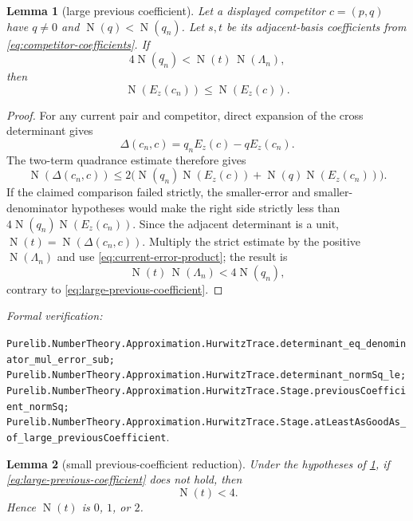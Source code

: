 \documentclass[11pt]{article}
\newtheorem{lemma}[lemma]{Lemma}
\newcommand{\Norm}[1]{\operatorname{N}\!\left(#1\right)}
\newcommand{\leanref}[1]{\par\smallskip\noindent
  \emph{Formal verification:}\par\nobreak
  {\raggedright\nolinkurl{#1}.\par}}
\begin{document}
\begin{lemma}[large previous coefficient]
\label{lem:large-previous-coefficient}
Let a displayed competitor $c=(p,q)$ have $q\ne0$ and
$\Norm q<\Norm{q_n}$.  Let $s,t$ be its adjacent-basis coefficients from
\eqref{eq:competitor-coefficients}.  If
\begin{equation}
\label{eq:large-previous-coefficient}
       4\Norm{q_n}<\Norm t\,\Norm{\Lambda_n},
\end{equation}
then
\[
                         \Norm{E_z(c_n)}\le\Norm{E_z(c)}.
\]
\end{lemma}

\begin{proof}
For any current pair and competitor, direct expansion of the cross
determinant gives
\[
 \Delta(c_n,c)=q_nE_z(c)-qE_z(c_n).
\]
The two-term quadrance estimate therefore gives
\begin{equation}
\label{eq:determinant-error-bound}
 \Norm{\Delta(c_n,c)}
 \le2\bigl(\Norm{q_n}\Norm{E_z(c)}
           +\Norm q\Norm{E_z(c_n)}\bigr).
\end{equation}
If the claimed comparison failed strictly, the smaller-error and
smaller-denominator hypotheses would make the right side strictly less than
$4\Norm{q_n}\Norm{E_z(c_n)}$.  Since the adjacent determinant is a unit,
$\Norm t=\Norm{\Delta(c_n,c)}$.  Multiply the strict estimate by the positive
$\Norm{\Lambda_n}$ and use
\eqref{eq:current-error-product}; the result is
\[
                 \Norm t\,\Norm{\Lambda_n}<4\Norm{q_n},
\]
contrary to \eqref{eq:large-previous-coefficient}.
\end{proof}

\leanref{Purelib.NumberTheory.Approximation.HurwitzTrace.determinant_eq_denominator_mul_error_sub;
Purelib.NumberTheory.Approximation.HurwitzTrace.determinant_normSq_le;
Purelib.NumberTheory.Approximation.HurwitzTrace.Stage.previousCoefficient_normSq;
Purelib.NumberTheory.Approximation.HurwitzTrace.Stage.atLeastAsGoodAs_of_large_previousCoefficient}

\begin{lemma}[small previous-coefficient reduction]
\label{lem:small-previous-coefficient}
Under the hypotheses of \cref{lem:large-previous-coefficient}, if
\eqref{eq:large-previous-coefficient} does not hold, then
\begin{equation}
\label{eq:previous-coefficient-small}
                              \Norm t<4.
\end{equation}
Hence $\Norm t$ is $0$, $1$, or $2$.
\end{lemma}
\end{document}
